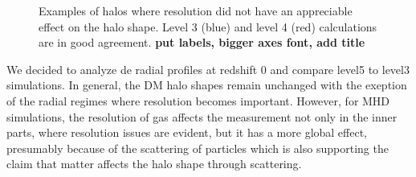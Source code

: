 \begin{figure}[!ht]
  \centering
  \hfill
  \caption{Examples of halos where resolution did not have an appreciable effect on the halo shape. Level 3 (blue) and level 4 (red) calculations are in good agreement. \textbf{put labels, bigger axes font, add title} }
\end{figure}



We decided to analyze de radial profiles at redshift 0 and compare level5 to level3 simulations. In general, the DM halo shapes remain unchanged with the exeption of the radial regimes where resolution becomes important. However, for MHD simulations, the resolution of gas affects the measurement not only in the inner parts, where resolution issues are evident, but it has a more global effect, presumably because of the scattering of particles which is also supporting the claim that matter affects the halo shape through scattering.\\

